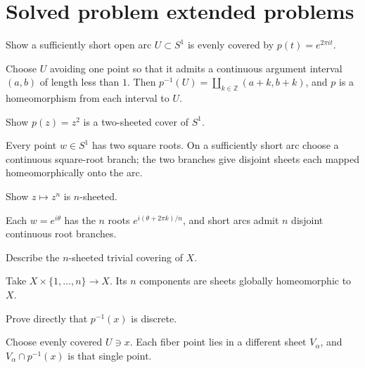 \section{Solved problem extended problems}

\begin{problem}\label{prob:viii10-01}
Show a sufficiently short open arc \(U\subset S^1\) is evenly covered by \(p(t)=e^{2\pi it}\).
\end{problem}
\begin{solution}
Choose \(U\) avoiding one point so that it admits a continuous argument interval \((a,b)\) of length less than \(1\). Then \(p^{-1}(U)=\coprod_{k\in\mathbb Z}(a+k,b+k)\), and \(p\) is a homeomorphism from each interval to \(U\).
\end{solution}

\begin{problem}\label{prob:viii10-02}
Show \(p(z)=z^2\) is a two-sheeted cover of \(S^1\).
\end{problem}
\begin{solution}
Every point \(w\in S^1\) has two square roots.  On a sufficiently short arc choose a continuous square-root branch; the two branches give disjoint sheets each mapped homeomorphically onto the arc.
\end{solution}

\begin{problem}\label{prob:viii10-03}
Show \(z\mapsto z^n\) is \(n\)-sheeted.
\end{problem}
\begin{solution}
Each \(w=e^{i\theta}\) has the \(n\) roots \(e^{i(\theta+2\pi k)/n}\), and short arcs admit \(n\) disjoint continuous root branches.
\end{solution}

\begin{problem}\label{prob:viii10-04}
Describe the \(n\)-sheeted trivial covering of \(X\).
\end{problem}
\begin{solution}
Take \(X\times\{1,\dots,n\}\to X\).  Its \(n\) components are sheets globally homeomorphic to \(X\).
\end{solution}

\begin{problem}\label{prob:viii10-05}
Prove directly that \(p^{-1}(x)\) is discrete.
\end{problem}
\begin{solution}
Choose evenly covered \(U\ni x\).  Each fiber point lies in a different sheet \(V_\alpha\), and \(V_\alpha\cap p^{-1}(x)\) is that single point.
\end{solution}

